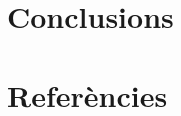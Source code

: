 \documentclass[a4paper]{article}
\begin{document}
\section{Conclusions}

\section{Referències}
\end{document}
